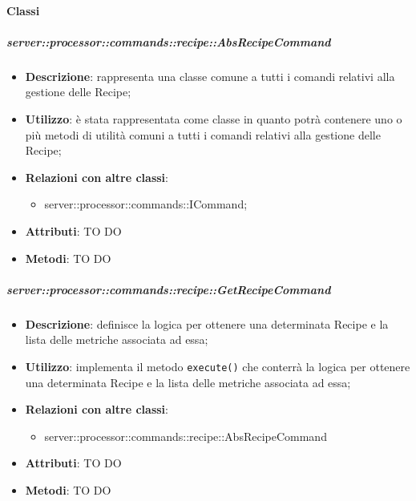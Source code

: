         \paragraph{Classi} %

        \subparagraph{server::processor::commands::recipe::AbsRecipeCommand} %
        \label{subp:bdsm_app_server_processor_commands_recipe_absrecipecommand}
        \begin{itemize}
          \item \textbf{Descrizione}: rappresenta una classe comune a tutti i comandi relativi alla gestione delle Recipe;
          \item \textbf{Utilizzo}: è stata rappresentata come classe in quanto potrà contenere uno o più metodi di utilità comuni a tutti i comandi relativi alla gestione delle Recipe;
          \item \textbf{Relazioni con altre classi}:
            \begin{itemize}
              \item server::processor::commands::ICommand;
            \end{itemize}
			\item \textbf{Attributi}: TO DO
			\item \textbf{Metodi}: TO DO
        \end{itemize}

        \subparagraph{server::processor::commands::recipe::GetRecipeCommand} %
        \label{subp:bdsm_app_server_processor_commands_recipe_getrecipecommand}
        \begin{itemize}
          \item \textbf{Descrizione}: definisce la logica per ottenere una determinata Recipe e la lista delle metriche associata ad essa;
          \item \textbf{Utilizzo}: implementa il metodo \texttt{execute()} che conterrà la logica per ottenere una determinata Recipe e la lista delle metriche associata ad essa;
          \item \textbf{Relazioni con altre classi}:
            \begin{itemize}
              \item server::processor::commands::recipe::AbsRecipeCommand
            \end{itemize}
			\item \textbf{Attributi}: TO DO
			\item \textbf{Metodi}: TO DO
        \end{itemize}

